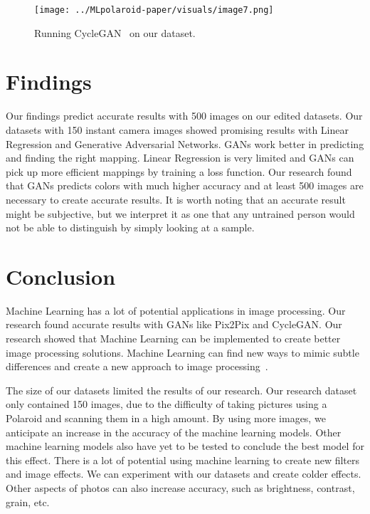 \documentclass[conference]{IEEEtran}
\begin{document}
\begin{figure}[htb!]
	\begin{center}
	\texttt{[image: ../MLpolaroid-paper/visuals/image7.png]}
	\caption{Running CycleGAN~\cite{zhu2017unpaired} on our dataset.}
	\label{fig:img7} 
	\end{center}
\end{figure}

\section{Findings}\label{section:Findings}

Our findings predict accurate results with 500 images on our edited datasets. Our datasets with 150 instant camera images showed promising results with Linear Regression and Generative Adversarial Networks. GANs work better in predicting and finding the right mapping. Linear Regression is very limited and GANs can pick up more efficient mappings by training a loss function. Our research found that GANs predicts colors with much higher accuracy and at least 500 images are necessary to create accurate results. 
It is worth noting that an accurate result might be subjective, but we interpret it as one that any untrained person would not be able to distinguish by simply looking at a sample. 

\section{Conclusion}\label{section:Conclusion}

Machine Learning has a lot of potential applications in image processing. Our research found accurate results with GANs like Pix2Pix and CycleGAN. Our research showed that Machine Learning can be implemented to create better image processing solutions. Machine Learning can find new ways to mimic subtle differences and create a new approach to image processing~\cite{spreeuwers1994image}. 

The size of our datasets limited the results of our research. Our research dataset only contained 150 images, due to the difficulty of taking pictures using a Polaroid and scanning them in a high amount. By using more images, we anticipate an increase in the accuracy of the machine learning models. Other machine learning models also have yet to be tested to conclude the best model for this effect. There is a lot of potential using machine learning to create new filters and image effects. We can experiment with our datasets and create colder effects. Other aspects of photos can also increase accuracy, such as brightness, contrast, grain, etc. 
\end{document}
